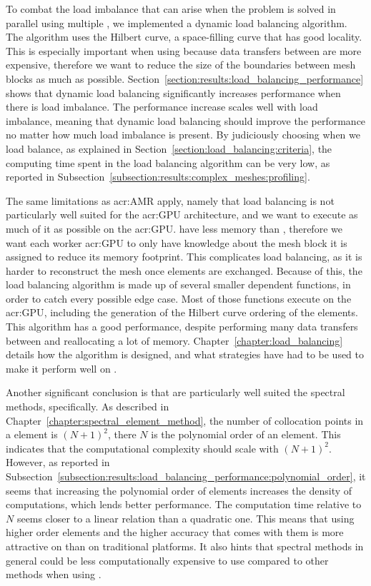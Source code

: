 To combat the load imbalance that can arise when the problem is solved in parallel using multiple
, we implemented a dynamic load balancing algorithm. The algorithm uses the
Hilbert curve, a space-filling curve that has good locality. This is especially important when using
 because data transfers between  are more expensive,
therefore we want to reduce the size of the boundaries between mesh blocks as much as possible. 
Section~\ref{section:results:load_balancing_performance} shows that dynamic load balancing
significantly increases performance when there is load imbalance. The performance increase scales
well with load imbalance, meaning that dynamic load balancing should improve the performance no
matter how much load imbalance is present. By judiciously choosing when we load balance, as
explained in Section~\ref{section:load_balancing:criteria}, the computing time spent in the load
balancing algorithm can be very low, as reported in
Subsection~\ref{subsection:results:complex_meshes:profiling}. 

The same limitations as \acrshort{acr:AMR} apply, namely that load balancing is not particularly
well suited for the \acrshort{acr:GPU} architecture, and we want to execute as much of it as
possible on the \acrshort{acr:GPU}.  have less memory than ,
therefore we want each worker \acrshort{acr:GPU} to only have knowledge about the mesh block it is
assigned to reduce its memory footprint. This complicates load balancing, as it is harder to
reconstruct the mesh once elements are exchanged. Because of this, the load balancing algorithm is
made up of several smaller dependent functions, in order to catch every possible edge case. Most of
those functions execute on the \acrshort{acr:GPU}, including the generation of the Hilbert curve
ordering of the elements. This algorithm has a good performance, despite performing many data
transfers between  and reallocating a lot of memory.
Chapter~\ref{chapter:load_balancing} details how the algorithm is designed, and what strategies have
had to be used to make it perform well on .

Another significant conclusion is that  are particularly well suited the
spectral methods, specifically. As described in Chapter~\ref{chapter:spectral_element_method}, the
number of collocation points in a element is \({\left( N + 1 \right)}^2\), there \(N\) is the
polynomial order of an element. This indicates that the computational complexity should scale with
\({\left( N + 1 \right)}^2\). However, as reported in
Subsection~\ref{subsection:results:load_balancing_performance:polynomial_order}, it seems that
increasing the polynomial order of elements increases the density of computations, which lends
better performance. The computation time relative to \(N\) seems closer to a linear relation than a
quadratic one. This means that using higher order elements and the higher accuracy that comes with
them is more attractive on  than on traditional platforms. It also hints that
spectral methods in general could be less computationally expensive to use compared to other methods
when using .

